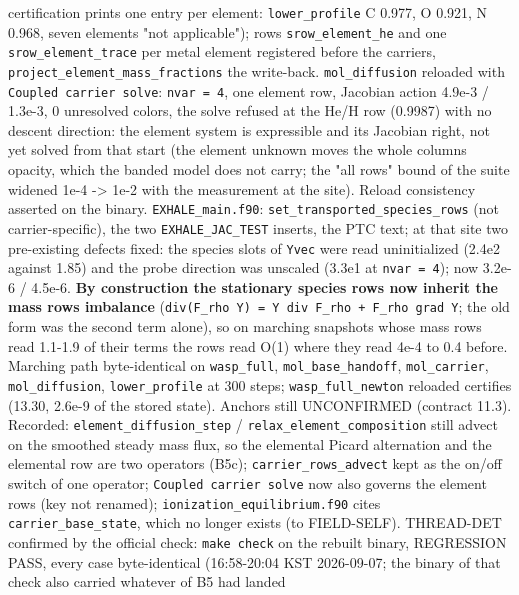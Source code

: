 \documentclass[english,a4paper]{my_memo}
\begin{document}
\begin{itemize}
  certification prints one entry per element: \texttt{lower\_profile} C 0.977, O
  0.921, N 0.968, seven elements "not applicable"); rows \texttt{srow\_element\_he}
  and one \texttt{srow\_element\_trace} per metal element registered before the
  carriers, \texttt{project\_element\_mass\_fractions} the write-back. \texttt{mol\_diffusion}
  reloaded with \texttt{Coupled\ carrier\ solve}: \texttt{nvar\ =\ 4}, one element row,
  Jacobian action 4.9e-3 / 1.3e-3, 0 unresolved colors, the solve refused
  at the He/H row (0.9987) with no descent direction: the element system is
  expressible and its Jacobian right, not yet solved from that start (the
  element unknown moves the whole column\textquotesingle s opacity, which the banded model
  does not carry; the "all rows" bound of the suite widened 1e-4 -\textgreater{} 1e-2
  with the measurement at the site). Reload consistency asserted on the
  binary. \texttt{EXHALE\_main.f90}: \texttt{set\_transported\_species\_rows} (not
  carrier-specific), the two \texttt{EXHALE\_JAC\_TEST} inserts, the PTC text; at
  that site two pre-existing defects fixed: the species slots of \texttt{Yvec} were
  read uninitialized (2.4e2 against 1.85) and the probe direction was
  unscaled (3.3e1 at \texttt{nvar\ =\ 4}); now 3.2e-6 / 4.5e-6. \textbf{By construction the
  stationary species rows now inherit the mass row\textquotesingle s imbalance}
  (\texttt{div(F\_rho\ Y)\ =\ Y\ div\ F\_rho\ +\ F\_rho\ grad\ Y}; the old form was the second
  term alone), so on marching snapshots whose mass rows read 1.1-1.9 of
  their terms the rows read O(1) where they read 4e-4 to 0.4 before.
  Marching path byte-identical on \texttt{wasp\_full}, \texttt{mol\_base\_handoff},
  \texttt{mol\_carrier}, \texttt{mol\_diffusion}, \texttt{lower\_profile} at 300 steps;
  \texttt{wasp\_full\_newton} reloaded certifies (13.30, 2.6e-9 of the stored state).
  Anchors still UNCONFIRMED (contract 11.3). Recorded: \texttt{element\_diffusion\_step}
  / \texttt{relax\_element\_composition} still advect on the smoothed steady mass
  flux, so the elemental Picard alternation and the elemental row are two
  operators (B5c); \texttt{carrier\_rows\_advect} kept as the on/off switch of one
  operator; \texttt{Coupled\ carrier\ solve} now also governs the element rows (key
  not renamed); \texttt{ionization\_equilibrium.f90} cites \texttt{carrier\_base\_state},
  which no longer exists (to FIELD-SELF).
  THREAD-DET confirmed by the official check: \texttt{make\ check} on the rebuilt
  binary, REGRESSION PASS, every case byte-identical (16:58-20:04 KST
  2026-09-07; the binary of that check also carried whatever of B5 had landed

\end{itemize}
\end{document}
